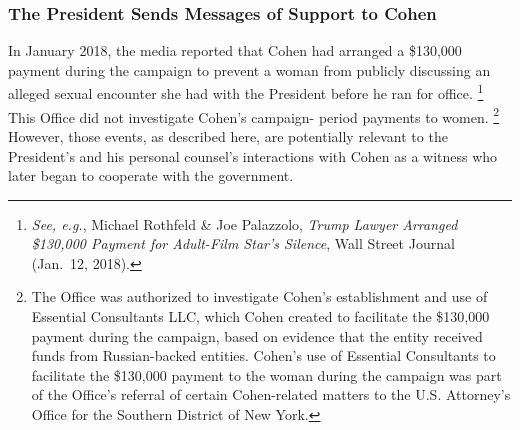 {\subsubsection{The President Sends Messages of Support to Cohen}

In January 2018, the media reported that Cohen had arranged a \$130,000 payment during the campaign to prevent a woman from publicly discussing an alleged sexual encounter she had with the President before he ran for office.%
\footnote{\textit{See, e.g.}, Michael Rothfeld \& Joe Palazzolo, \textit{Trump Lawyer Arranged \$130,000 Payment for Adult-Film Star's Silence}, Wall Street Journal (Jan.~12, 2018).}
This Office did not investigate Cohen's campaign- period payments to women.%
\footnote{The Office was authorized to investigate Cohen's establishment and use of Essential Consultants LLC, which Cohen created to facilitate the \$130,000 payment during the campaign, based on evidence that the entity received funds from Russian-backed entities.
Cohen's use of Essential Consultants to facilitate the \$130,000 payment to the woman during the campaign was part of the Office's referral of certain Cohen-related matters to the U.S. Attorney's Office for the Southern District of New York.}
However, those events, as described here, are potentially relevant to the President's and his personal counsel's interactions with Cohen as a witness who later began to cooperate with the government.

}
